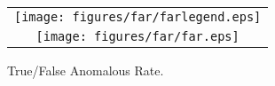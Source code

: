 
\begin{wrapfigure}{R}{0.52\textwidth}
\centering
\vspace{-8mm}

\vspace{-3mm}
\begin{small}
\begin{tabular}{c}
\vspace{-3mm}
\texttt{[image: figures/far/farlegend.eps]}  \\ [-2mm]
    \texttt{[image: figures/far/far.eps]}
\end{tabular}
\vspace{-5mm}
\caption{True/False Anomalous Rate.}
\label{fig:far}
\vspace{-3mm}
\end{small}
\end{wrapfigure}